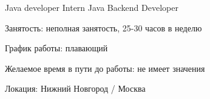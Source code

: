 


\begin{cventries}

  \cventry
    {Java developer} %
    {Intern Java Backend Developer} %
    {} %
    {} %
    {
      \begin{cvitems} %
      \item{Занятость: неполная занятость, 25-30 часов в неделю}
      \item{График работы: плавающий}
      \item{Желаемое время в пути до работы: не имеет значения}
      \item{Локация: Нижний Новгород / Москва}
      \end{cvitems}
    }

\end{cventries}
